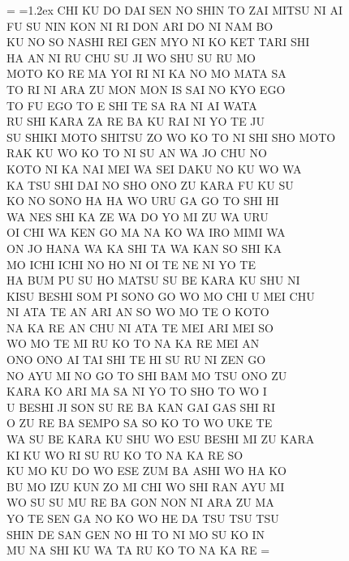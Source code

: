 \documentclass[12pt]{report}
\newcommand{\sbJapanese}[1]{
  \newdimen\origiwspc
  \origiwspc=\fontdimen2\font
  \fontdimen2\font=1.2ex          %
  {#1}
  \fontdimen2\font=\origiwspc
}
\begin{document}
\sbJapanese{
  CHI KU DO DAI SEN NO SHIN TO ZAI MITSU NI AI\\
  FU SU NIN KON NI RI DON ARI DO NI NAM BO\\
  KU NO SO NASHI REI GEN MYO NI KO KET TARI SHI\\
  HA AN NI RU CHU SU JI WO SHU SU RU MO\\
  MOTO KO RE MA YOI RI NI KA NO MO MATA SA\\
  TO RI NI ARA ZU MON MON IS SAI NO KYO EGO\\
  TO FU EGO TO E SHI TE SA RA NI AI WATA\\
  RU SHI KARA ZA RE BA KU RAI NI YO TE JU\\
  SU SHIKI MOTO SHITSU ZO WO KO TO NI SHI SHO MOTO\\
  RAK KU WO KO TO NI SU AN WA JO CHU NO\\
  KOTO NI KA NAI MEI WA SEI DAKU NO KU WO WA\\
  KA TSU SHI DAI NO SHO ONO ZU KARA FU KU SU\\
  KO NO SONO HA HA WO URU GA GO TO SHI HI\\
  WA NES SHI KA ZE WA DO YO MI ZU WA URU\\
  OI CHI WA KEN GO MA NA KO WA IRO MIMI WA\\
  ON JO HANA WA KA SHI TA WA KAN SO SHI KA\\
  MO ICHI ICHI NO HO NI OI TE NE NI YO TE\\
  HA BUM PU SU HO MATSU SU BE KARA KU SHU NI\\
  KISU BESHI SOM PI SONO GO WO MO CHI U MEI CHU\\
  NI ATA TE AN ARI AN SO WO MO TE O KOTO\\
  NA KA RE AN CHU NI ATA TE MEI ARI MEI SO\\
  WO MO TE MI RU KO TO NA KA RE MEI AN\\
  ONO ONO AI TAI SHI TE HI SU RU NI ZEN GO\\
  NO AYU MI NO GO TO SHI BAM MO TSU ONO ZU\\
  KARA KO ARI MA SA NI YO TO SHO TO WO I\\
  U BESHI JI SON SU RE BA KAN GAI GAS SHI RI\\
  O ZU RE BA SEMPO SA SO KO TO WO UKE TE\\
  WA SU BE KARA KU SHU WO ESU BESHI MI ZU KARA\\
  KI KU WO RI SU RU KO TO NA KA RE SO\\
  KU MO KU DO WO ESE ZUM BA ASHI WO HA KO\\
  BU MO IZU KUN ZO MI CHI WO SHI RAN AYU MI\\
  WO SU SU MU RE BA GON NON NI ARA ZU MA\\
  YO TE SEN GA NO KO WO HE DA TSU TSU TSU\\
  SHIN DE SAN GEN NO HI TO NI MO SU KO IN\\
  MU NA SHI KU WA TA RU KO TO NA KA RE
}
\end{document}
